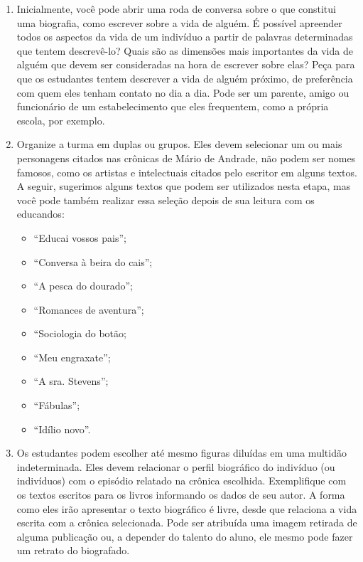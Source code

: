 \documentclass[12pt]{extarticle}
\begin{document}
\begin{enumerate}

\item
Inicialmente, você pode abrir uma roda de
conversa sobre o que constitui uma biografia, como escrever sobre a vida
de alguém. É possível apreender todos os aspectos da vida de um
indivíduo a partir de palavras determinadas que tentem descrevê-lo?
Quais são as dimensões mais importantes da vida de alguém que devem ser
consideradas na hora de escrever sobre elas? Peça para que os estudantes
tentem descrever a vida de alguém próximo, de preferência com quem eles
tenham contato no dia a dia. Pode ser um parente, amigo ou funcionário
de um estabelecimento que eles frequentem, como a própria escola, por
exemplo.

\item
Organize a turma em duplas ou grupos. Eles devem selecionar um ou
mais personagens citados nas crônicas de Mário de Andrade, não podem ser
nomes famosos, como os artistas e intelectuais citados pelo escritor em
alguns textos. A seguir, sugerimos alguns textos que podem ser
utilizados nesta etapa, mas você pode também realizar essa seleção
depois de sua leitura com os educandos:

\begin{itemize}
\item
  ``Educai vossos pais'';
\item
  ``Conversa à beira do cais'';
\item
  ``A pesca do dourado'';
\item
  ``Romances de aventura'';
\item
  ``Sociologia do botão;
\item
  ``Meu engraxate'';
\item
  ``A sra. Stevens'';
\item
  ``Fábulas'';
\item
  ``Idílio novo''.
\end{itemize}

\item
Os estudantes podem escolher até mesmo figuras diluídas em uma
multidão indeterminada. Eles devem relacionar o perfil biográfico do
indivíduo (ou indivíduos) com o episódio relatado na crônica escolhida.
Exemplifique com os textos escritos para os livros informando os dados
de seu autor. A forma como eles irão apresentar o texto biográfico é
livre, desde que relaciona a vida escrita com a crônica selecionada.
Pode ser atribuída uma imagem retirada de alguma publicação ou, a
depender do talento do aluno, ele mesmo pode fazer um retrato do
biografado.
\end{enumerate}
\end{document}
